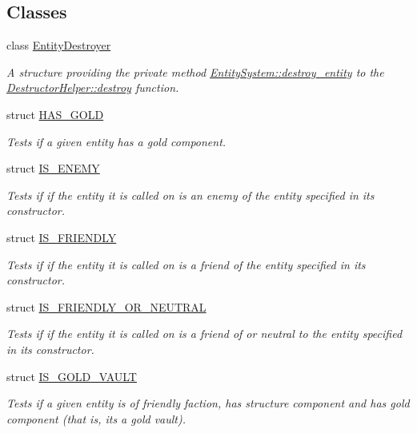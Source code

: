 \subsection*{Classes}
\begin{DoxyCompactItemize}
\item 
class \hyperlink{classutil_1_1_entity_destroyer}{Entity\+Destroyer}
\begin{DoxyCompactList}\small\item\em A structure providing the private method \hyperlink{class_entity_system_a4ecd6127995602d98736cd1cf5799c11}{Entity\+System\+::destroy\+\_\+entity} to the \hyperlink{namespace_destructor_helper_a93b8f71a2769c231679141fcef275bdb}{Destructor\+Helper\+::destroy} function. \end{DoxyCompactList}\item 
struct \hyperlink{structutil_1_1_h_a_s___g_o_l_d}{H\+A\+S\+\_\+\+G\+O\+LD}
\begin{DoxyCompactList}\small\item\em Tests if a given entity has a gold component. \end{DoxyCompactList}\item 
struct \hyperlink{structutil_1_1_i_s___e_n_e_m_y}{I\+S\+\_\+\+E\+N\+E\+MY}
\begin{DoxyCompactList}\small\item\em Tests if if the entity it is called on is an enemy of the entity specified in it\textquotesingle{}s constructor. \end{DoxyCompactList}\item 
struct \hyperlink{structutil_1_1_i_s___f_r_i_e_n_d_l_y}{I\+S\+\_\+\+F\+R\+I\+E\+N\+D\+LY}
\begin{DoxyCompactList}\small\item\em Tests if if the entity it is called on is a friend of the entity specified in it\textquotesingle{}s constructor. \end{DoxyCompactList}\item 
struct \hyperlink{structutil_1_1_i_s___f_r_i_e_n_d_l_y___o_r___n_e_u_t_r_a_l}{I\+S\+\_\+\+F\+R\+I\+E\+N\+D\+L\+Y\+\_\+\+O\+R\+\_\+\+N\+E\+U\+T\+R\+AL}
\begin{DoxyCompactList}\small\item\em Tests if if the entity it is called on is a friend of or neutral to the entity specified in it\textquotesingle{}s constructor. \end{DoxyCompactList}\item 
struct \hyperlink{structutil_1_1_i_s___g_o_l_d___v_a_u_l_t}{I\+S\+\_\+\+G\+O\+L\+D\+\_\+\+V\+A\+U\+LT}
\begin{DoxyCompactList}\small\item\em Tests if a given entity is of friendly faction, has structure component and has gold component (that is, it\textquotesingle{}s a gold vault). \end{DoxyCompactList}\end{DoxyCompactItemize}
